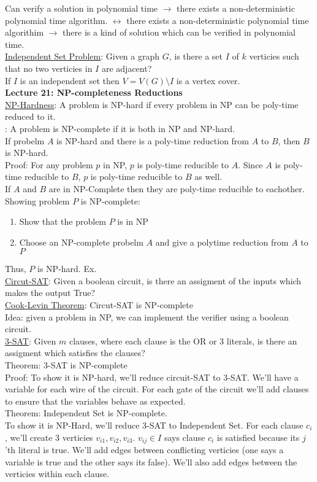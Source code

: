 \documentclass{article}
\begin{document}
Can verify a solution in polynomial time $\rightarrow$ there exists a non-deterministic polynomial time algorithm. $\longleftrightarrow$ there exists a non-deterministic polynomial time algorithim $\rightarrow$ there is a kind of solution which can be verified in polynomial time. \\[0.5ex]
\underline{Independent Set Problem}: Given a graph $G$, is there a set $I$ of $k$ verticies such that no two verticies in $I$ are adjacent?\\ 
If $I$ is an independent set then $V = V(G) \setminus I$ is a vertex cover.  \\[1.0ex]
\textbf{Lecture 21: NP-completeness Reductions} \\[1.0ex]
\underline{NP-Hardness}: A problem is NP-hard if every problem in NP can be poly-time reduced to it. \\[0.5ex]
: A problem is NP-complete if it is both in NP and NP-hard. \\
If probelm $A$ is NP-hard and there is a poly-time reduction from $A$ to $B$, then $B$ is NP-hard. \\
Proof: For any problem $p$ in NP, $p$ is poly-time reducible to $A$. Since $A$ is poly-time reducible to $B$, $p$ is poly-time reducible to $B$ as well. \\
If $A$ and $B$ are in NP-Complete then they are poly-time reducible to eachother. \\[0.5ex]
Showing problem $P$ is NP-complete: 
\begin{enumerate}
    \item Show that the problem $P$ is in NP
    \item Choose an NP-complete probelm $A$ and give a polytime reduction from $A$ to $P$
\end{enumerate}
Thus, $P$ is NP-hard. Ex. \\[0.5ex]
\underline{Circut-SAT}: Given a boolean circuit, is there an assigment of the inputs which makes the output True? \\[0.5ex]
\underline{Cook-Levin Theorem}: Circut-SAT is NP-complete \\[0.5ex]
Idea: given a problem in NP, we can implement the verifier using a boolean circuit. \\
\underline{3-SAT}: Given $m$ clauses, where each clause is the OR or 3 literals, is there an assigment which satisfies the clauses? \\[0.5ex]
Theorem: 3-SAT is NP-complete \\[0.5ex]
Proof: To show it is NP-hard, we'll reduce circuit-SAT to 3-SAT. We'll have a variable for each wire of the circuit. For each gate of the circuit we'll add clauses to ensure that the variables behave as expected. \\[0.5ex]
Theorem: Independent Set is NP-complete. \\[0.5ex]
To show it is NP-Hard, we'll reduce 3-SAT to Independent Set. For each clause $c_i$, we'll create 3 verticies $v_{i1}, v_{i2}, v_{i3}$. $v_{ij} \in I$ says clause $c_i$ is satisfied because its $j$'th literal is true. We'll add edges between conflicting verticies (one says a variable is true and the other says its false). We'll also add edges between the verticies within each clause.
\end{document}
